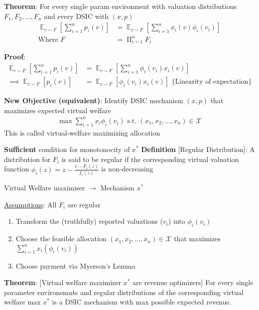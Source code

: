 \documentclass[11pt]{article}
\begin{document}
\textbf{Theorem}: For every single param environment with valuation distributions \(F_1, F_2, ..., F_n\) and every DSIC with \((x, p)\)
\begin{align*}
\mathop{\mathbb{E}}_{v \sim F} \left[ \sum_{i=1}^n p_i(v) \right] &= \mathop{\mathbb{E}}_{v \sim F} \left[ \sum_{i=1}^n x_i(v) \phi_i(v_i) \right] \\
\text{Where } F &= \mathop{\Pi}_{i=1}^nF_i
\end{align*}

\textbf{Proof}:
\begin{align*}
\mathop{\mathbb{E}}_{v \sim F} \left[ \sum_{i=1}^n p_i(v) \right] &= \mathop{\mathbb{E}}_{v \sim F} \left[ \sum_{i=1}^n \phi_i(v_i)x_i(v) \right] \\
\implies \mathop{\mathbb{E}}_{v \sim F} \left[ p_i(v) \right] &= \mathop{\mathbb{E}}_{v \sim F} \left[ \phi_i(v_i) x_i(v) \right] \text{  \{Linearity of expectation\}}
\end{align*}


\textbf{New Objective (equivalent)}: Identify DSIC mechanism \((x, p)\) that maximizes expected virtual welfare
\begin{align*}
\max \sum_{i=1}^n x_i \phi_i(v_i) \text{    s.t.   } (x_1, x_2, ..., x_n) \in \mathcal{X}
\end{align*}
This is called virtual-welfare maximizing allocation

\textbf{Sufficient} condition for monotonocity of \(x^{*}\)
\textbf{Definition} [Regular Distribution]: A distribution for \(F_i\) is said to be regular if the
corresponding virtual valuation function \(\phi_i(z) = z - \frac{1 - F_i(z)}{f_i(z)}\) is non-decreasing

Virtual Welfare maximiser \(\rightarrow\) Mechanism \(x^{*}\)

\uline{Assumptions}: All \(F_i\) are regular
\begin{enumerate}
\item Transform the (truthfully) reported valuations (\(v_i\)) into \(\phi_i(v_i)\)
\item Choose the feasible allocation \((x_1, x_2, ..., x_n) \in \mathcal{X}\) that maximizes \(\sum_{i=1}^nx_i(\phi_i(v_i))\)
\item Choose payment via Myerson's Lemma
\end{enumerate}

\textbf{Theorem}: [Virtual welfare maximizer \(x^{*}\) are revenue optimizers]
For every single parameter environemnts and regular distributions of the corresponding virtual welfare max \(x^{*}\) is a DSIC mechanism with max possible expected revenue.
\end{document}
